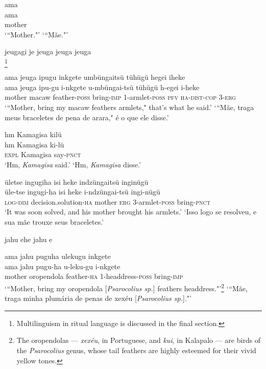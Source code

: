 \documentclass[output=paper,
modfonts,nonflat
]{langsci/langscibook}
\begin{document}
\ea  ama\\[.3em]
\gll ama\\
     mother\\
\glt ‘“Mother."’
\glt ‘“Mãe."’
\z

\ea  jeugagi je jeuga jeuga jeuga\\[.3em]
\footnote{Multilinguism in ritual language is discussed in the final section.}
\z

\ea  ama jeuga ipugu inkgete umbüngaitsü tühügü hegei iheke\\[.3em]
\gll ama jeuga ipu-gu i-nkgete u-mbüngai-tsü tühügü h-egei i-heke\\
     mother macaw feather-\textsc{poss} bring-\textsc{imp} 1-armlet-\textsc{poss} \textsc{pfv} \textsc{ha}-\textsc{dist}-\textsc{cop} 3-\textsc{erg}\\
\glt ‘“Mother, bring my macaw feathers armlets," that's what he said.’
\glt ‘“Mãe, traga meus braceletes de pena de arara," é o que ele disse.’
\z

\ea  hm Kamagisa kilü\\[.3em]
\gll hm Kamagisa ki-lü\\
     \textsc{expl} Kamagisa say-\textsc{pnct}\\
\glt ‘Hm, \textit{Kamagisa} said.’
\glt ‘Hm, \textit{Kamagisa} disse.’
\z

\ea  ületse ingugiha isi heke indzüngaitsü inginügü\\[.3em]
\gll üle-tse ingugi-ha isi heke i-ndzüngai-tsü ingi-nügü\\
     \textsc{log}-\textsc{dim} decision.solution-\textsc{ha} mother \textsc{erg} 3-armlet-\textsc{poss} bring-\textsc{pnct}\\
\glt ‘It was soon solved, and his mother brought his armlets.’
\glt ‘Isso logo se resolveu, e sua mãe trouxe seus braceletes.’
\z

\ea  jahu ehe jahu e\\[.3em]
\z

\ea  ama jahu puguha ulekugu inkgete\\[.3em]
\gll ama jahu pugu-ha u-leku-gu i-nkgete\\
     mother oropendola feather-\textsc{ha} 1-headdress-\textsc{poss} bring-\textsc{imp}\\
\glt ‘“Mother, bring my oropendola [\textit{Psarocolius sp.}] feathers headdress."’\footnote{The oropendolas — \textit{xexéu}, in Portuguese, and \textit{kui}, in Kalapalo — are birds of the \textit{Psarocolius} genus, whose tail feathers are highly esteemed for their vivid yellow tones.}
\glt ‘“Mãe, traga minha plumária de penas de xexéu [\textit{Psarocolius sp.}]."’
\z
\end{document}
